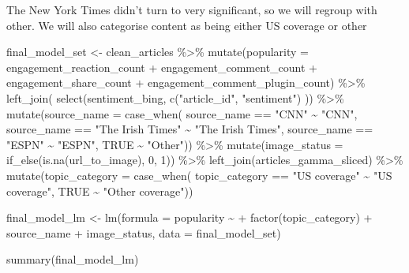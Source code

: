 \documentclass[
]{article}
\newenvironment{Shaded}{\begin{snugshade}}{\end{snugshade}}
\newcommand{\AttributeTok}[1]{\textcolor[rgb]{0.77,0.63,0.00}{#1}}
\newcommand{\ConstantTok}[1]{\textcolor[rgb]{0.00,0.00,0.00}{#1}}
\newcommand{\DecValTok}[1]{\textcolor[rgb]{0.00,0.00,0.81}{#1}}
\newcommand{\FunctionTok}[1]{\textcolor[rgb]{0.00,0.00,0.00}{#1}}
\newcommand{\NormalTok}[1]{#1}
\newcommand{\OtherTok}[1]{\textcolor[rgb]{0.56,0.35,0.01}{#1}}
\newcommand{\SpecialCharTok}[1]{\textcolor[rgb]{0.00,0.00,0.00}{#1}}
\newcommand{\StringTok}[1]{\textcolor[rgb]{0.31,0.60,0.02}{#1}}
\begin{document}
The New York Times didn't turn to very significant, so we will regroup
with other. We will also categorise content as being either US coverage
or other

\begin{Shaded}
\begin{Highlighting}[]
\NormalTok{final\_model\_set }\OtherTok{\textless{}{-}}\NormalTok{ clean\_articles }\SpecialCharTok{\%\textgreater{}\%}
\FunctionTok{mutate}\NormalTok{(}\AttributeTok{popularity =}\NormalTok{ engagement\_reaction\_count }\SpecialCharTok{+}\NormalTok{ engagement\_comment\_count }\SpecialCharTok{+}\NormalTok{ engagement\_share\_count }\SpecialCharTok{+}\NormalTok{ engagement\_comment\_plugin\_count) }\SpecialCharTok{\%\textgreater{}\%}
\FunctionTok{left\_join}\NormalTok{(}
           \FunctionTok{select}\NormalTok{(sentiment\_bing, }\FunctionTok{c}\NormalTok{(}\StringTok{"article\_id"}\NormalTok{, }\StringTok{"sentiment"}\NormalTok{)}
\NormalTok{                                                              )) }\SpecialCharTok{\%\textgreater{}\%}
\FunctionTok{mutate}\NormalTok{(}\AttributeTok{source\_name =} \FunctionTok{case\_when}\NormalTok{(}
\NormalTok{    source\_name }\SpecialCharTok{==} \StringTok{"CNN"}                  \SpecialCharTok{\textasciitilde{}} \StringTok{"CNN"}\NormalTok{,}
\NormalTok{    source\_name }\SpecialCharTok{==} \StringTok{"The Irish Times"}      \SpecialCharTok{\textasciitilde{}} \StringTok{"The Irish Times"}\NormalTok{,}
\NormalTok{    source\_name }\SpecialCharTok{==} \StringTok{"ESPN"}                 \SpecialCharTok{\textasciitilde{}} \StringTok{"ESPN"}\NormalTok{,}
    \ConstantTok{TRUE}                                  \SpecialCharTok{\textasciitilde{}} \StringTok{"Other"}\NormalTok{)) }\SpecialCharTok{\%\textgreater{}\%}
\FunctionTok{mutate}\NormalTok{(}\AttributeTok{image\_status =} \FunctionTok{if\_else}\NormalTok{(}\FunctionTok{is.na}\NormalTok{(url\_to\_image), }\DecValTok{0}\NormalTok{, }\DecValTok{1}\NormalTok{)) }\SpecialCharTok{\%\textgreater{}\%}
\FunctionTok{left\_join}\NormalTok{(articles\_gamma\_sliced)  }\SpecialCharTok{\%\textgreater{}\%}
 \FunctionTok{mutate}\NormalTok{(}\AttributeTok{topic\_category =} \FunctionTok{case\_when}\NormalTok{(}
\NormalTok{    topic\_category }\SpecialCharTok{==} \StringTok{"US coverage"}   \SpecialCharTok{\textasciitilde{}} \StringTok{"US coverage"}\NormalTok{,}
    \ConstantTok{TRUE}                               \SpecialCharTok{\textasciitilde{}} \StringTok{"Other coverage"}\NormalTok{))}

\NormalTok{final\_model\_lm }\OtherTok{\textless{}{-}} \FunctionTok{lm}\NormalTok{(}\AttributeTok{formula =}\NormalTok{ popularity }\SpecialCharTok{\textasciitilde{}} \SpecialCharTok{+} \FunctionTok{factor}\NormalTok{(topic\_category) }\SpecialCharTok{+}\NormalTok{ source\_name }\SpecialCharTok{+}\NormalTok{ image\_status, }\AttributeTok{data =}\NormalTok{ final\_model\_set)}
        
\FunctionTok{summary}\NormalTok{(final\_model\_lm)}
\end{Highlighting}
\end{Shaded}
\end{document}
